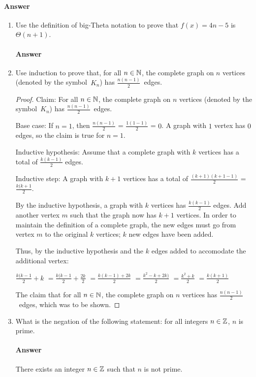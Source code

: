 \documentclass{article}
\begin{document}
\paragraph{Answer}
\todo{}

\collab{\todo{}}

\begin{enumerate}

    \item Use the definition of big-Theta notation to prove that $f(x)=4n-5$
        is $\Theta(n+1)$.

        \paragraph{Answer}
        \todo{}

    \item Use induction to prove that, for all $n \in {\mathbb N}$, the complete graph on
        $n$ vertices (denoted by the symbol~$K_n$) has $\frac{n(n-1)}{2}$~edges.

        \begin{proof}
	Claim: For all $n \in {\mathbb N}$, the complete graph on
        $n$ vertices (denoted by the symbol~$K_n$) has $\frac{n(n-1)}{2}$~edges.
	
	Base case: If $n = 1$, then $\frac{n(n-1)}{2}$ = $\frac{1(1-1)}{2}$ = $0$. A graph with $1$ vertex has $0$ edges, so the claim is true for $n = 1$.

	Inductive hypothesis: Assume that a complete graph with $k$ vertices has a total of $\frac{k(k-1)}{2}$ edges.

	Inductive step: A graph with $k + 1$ vertices has a total of $\frac{(k+1)(k+1-1)}{2}$ = $\frac{k(k+1}{2}$. 

	By the inductive hypothesis, a graph with $k$ vertices has $\frac{k(k-1)}{2}$ edges. Add another vertex $m$ such that the graph now has $k+1$ vertices. In order to maintain the definition of a complete graph, the new edges must go from vertex $m$ to the original $k$ vertices; $k$ new edges have been added. 

	Thus, by the inductive hypothesis and the $k$ edges added to accomodate the additional vertex: 

	$\frac{k(k-1}{2} + k$
	$= \frac{k(k-1}{2} + \frac{2k}{2}$
	$ = \frac{k(k-1) + 2k}{2}$
	$ = \frac{k^2 - k +2k)}{2} $
	$ = \frac{k^2 + k}{2}$
	$ = \frac{k(k+1)}{2}$
	
	The claim that for all $n \in {\mathbb N}$, the complete graph on $n$ vertices has $\frac{n(n-1)}{2}$~edges, which was to be shown.
        \end{proof}

    \item What is the negation of the following statement: for all integers $n
        \in {\mathbb Z}$, $n$ is prime.

        \paragraph{Answer}{There exists an integer $n \in {\mathbb Z}$ such that $n$ is not prime.}

\end{enumerate}
\end{document}
